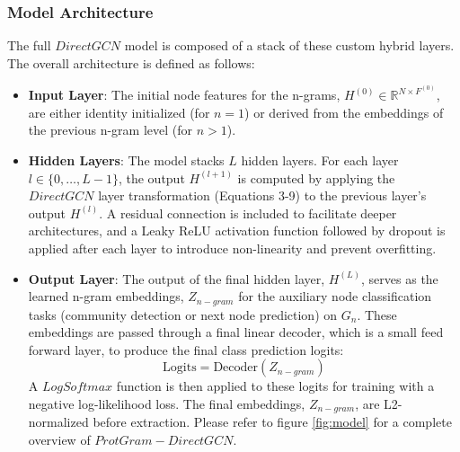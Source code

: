 \documentclass[utf8]{article}
\begin{document}
	\subsubsection{Model Architecture}
	The full $DirectGCN$ model is composed of a stack of these custom hybrid layers. The overall architecture is defined as follows:
	\begin{itemize}
		\item \textbf{Input Layer}: The initial node features for the n-grams, $H^{(0)} \in \mathbb{R}^{N \times F^{(0)}}$, are either identity initialized (for $n=1$) or derived from the embeddings of the previous n-gram level (for $n>1$).
		\item \textbf{Hidden Layers}: The model stacks $L$ hidden layers. For each layer $l \in \{0, \dots, L-1\}$, the output $H^{(l+1)}$ is computed by applying the $DirectGCN$ layer transformation (Equations 3-9) to the previous layer's output $H^{(l)}$. A residual connection is included to facilitate deeper architectures, and a Leaky ReLU activation function followed by dropout is applied after each layer to introduce non-linearity and prevent overfitting.
		\item \textbf{Output Layer}: The output of the final hidden layer, $H^{(L)}$, serves as the learned n-gram embeddings, $Z_{n-gram}$ for the auxiliary node classification tasks (community detection \cite{blondel_fastunfoldingcommunities_2008} or next node prediction) on $G_{n}$. These embeddings are passed through a final linear decoder, which is a small feed forward layer, to produce the final class prediction logits:
		\begin{equation}
			\text{Logits} = \text{Decoder}(Z_{n-gram})
		\end{equation}
		A $LogSoftmax$ function is then applied to these logits for training with a negative log-likelihood loss. The final embeddings, $Z_{n-gram}$, are L2-normalized before extraction. Please refer to figure \ref{fig:model} for a complete overview of $ProtGram-DirectGCN$.
	\end{itemize}
\end{document}
